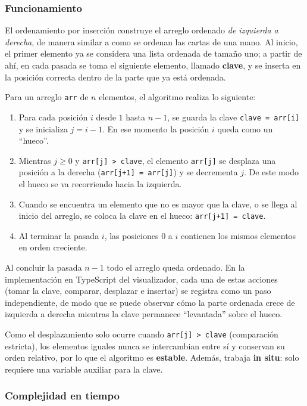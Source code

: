 \documentclass[11pt,letterpaper]{article}
\begin{document}
\subsubsection{Funcionamiento}

El ordenamiento por inserción construye el arreglo ordenado \emph{de izquierda a derecha}, de manera similar a como se ordenan las cartas de una mano. Al inicio, el primer elemento ya se considera una lista ordenada de tamaño uno; a partir de ahí, en cada pasada se toma el siguiente elemento, llamado \textbf{clave}, y se inserta en la posición correcta dentro de la parte que ya está ordenada.

Para un arreglo \texttt{arr} de $n$ elementos, el algoritmo realiza lo siguiente:

\begin{enumerate}
  \item Para cada posición $i$ desde $1$ hasta $n-1$, se guarda la clave \texttt{clave = arr[i]} y se inicializa $j = i - 1$. En ese momento la posición $i$ queda como un ``hueco''.
  \item Mientras $j \geq 0$ y \texttt{arr[j] > clave}, el elemento \texttt{arr[j]} se desplaza una posición a la derecha (\texttt{arr[j+1] = arr[j]}) y se decrementa $j$. De este modo el hueco se va recorriendo hacia la izquierda.
  \item Cuando se encuentra un elemento que no es mayor que la clave, o se llega al inicio del arreglo, se coloca la clave en el hueco: \texttt{arr[j+1] = clave}.
  \item Al terminar la pasada $i$, las posiciones $0$ a $i$ contienen los mismos elementos en orden creciente.
\end{enumerate}

Al concluir la pasada $n-1$ todo el arreglo queda ordenado. En la implementación en TypeScript del visualizador, cada una de estas acciones (tomar la clave, comparar, desplazar e insertar) se registra como un paso independiente, de modo que se puede observar cómo la parte ordenada crece de izquierda a derecha mientras la clave permanece ``levantada'' sobre el hueco.

Como el desplazamiento solo ocurre cuando \texttt{arr[j] > clave} (comparación estricta), los elementos iguales nunca se intercambian entre sí y conservan su orden relativo, por lo que el algoritmo es \textbf{estable}. Además, trabaja \textbf{in situ}: solo requiere una variable auxiliar para la clave.

\subsubsection{Complejidad en tiempo}
\end{document}
